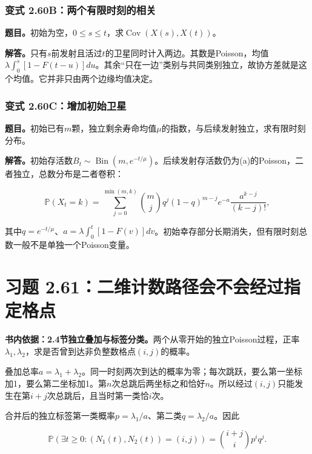 \documentclass[12pt,a4paper,UTF8,fontset=fandol]{ctexart}
\begin{document}
\subsubsection{变式
2.60B：两个有限时刻的相关}\label{ux53d8ux5f0f-2.60bux4e24ux4e2aux6709ux9650ux65f6ux523bux7684ux76f8ux5173}

\textbf{题目。}初始为空，\(0\le s\le t\)，求\(\operatorname{Cov}(X(s),X(t))\)。

\textbf{解答。}只有\(s\)前发射且活过\(t\)的卫星同时计入两边。其数是Poisson，均值\(\lambda\int_0^s[1-F(t-u)]du\)。其余``只在一边''类别与共同类别独立，故协方差就是这个均值。它并非只由两个边缘均值决定。

\subsubsection{变式
2.60C：增加初始卫星}\label{ux53d8ux5f0f-2.60cux589eux52a0ux521dux59cbux536bux661f}

\textbf{题目。}初始已有\(m\)颗，独立剩余寿命均值\(\mu\)的指数，与后续发射独立，求有限时刻分布。

\textbf{解答。}初始存活数\(B_t\sim\operatorname{Bin}(m,e^{-t/\mu})\)。后续发射存活数仍为(a)的Poisson，二者独立，总数分布是二者卷积：

\[\mathbb P(X_t=k)=\sum_{j=0}^{\min(m,k)}\binom mj
q^j(1-q)^{m-j}e^{-a}\frac{a^{k-j}}{(k-j)!},\]

其中\(q=e^{-t/\mu}\)、\(a=\lambda\int_0^t[1-F(v)]dv\)。初始幸存部分长期消失，但有限时刻总数一般不是单独一个Poisson变量。

\section{习题
2.61：二维计数路径会不会经过指定格点}\label{ux4e60ux9898-2.61ux4e8cux7ef4ux8ba1ux6570ux8defux5f84ux4f1aux4e0dux4f1aux7ecfux8fc7ux6307ux5b9aux683cux70b9}

\textbf{书内依据：2.4节独立叠加与标签分类。}两个从零开始的独立Poisson过程，正率\(\lambda_1,\lambda_2\)，求是否曾到达非负整数格点\((i,j)\)的概率。

叠加总率\(a=\lambda_1+\lambda_2\)。同一时刻两次到达的概率为零；每次跳跃，要么第一坐标加1，要么第二坐标加1。第\(n\)次总跳后两坐标之和恰好\(n\)。所以经过\((i,j)\)只能发生在第\(i+j\)次总跳后，且当时第一类恰\(i\)次。

合并后的独立标签第一类概率\(p=\lambda_1/a\)、第二类\(q=\lambda_2/a\)。因此

\[\boxed{\mathbb P(\exists t\ge0:(N_1(t),N_2(t))=(i,j))
=\binom{i+j}{i}p^i q^j.}\]
\end{document}

